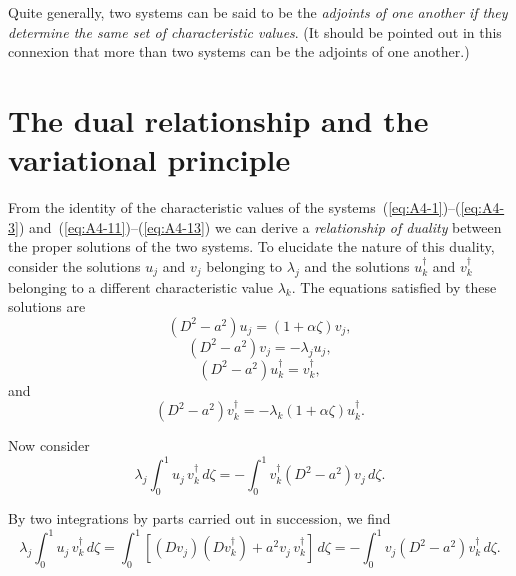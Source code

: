 Quite generally, two systems can be said to be the \emph{adjoints of one another
if they determine the same set of characteristic values}. (It should be
pointed out in this connexion that more than two systems can be the
adjoints of one another.)

\section{The dual relationship and the variational principle}
\label{sec:131}

From the identity of the characteristic values of the systems~(\ref{eq:A4-1})--(\ref{eq:A4-3})
and~(\ref{eq:A4-11})--(\ref{eq:A4-13}) we can derive a \emph{relationship of duality} between the proper
solutions of the two systems. To elucidate the nature of this duality,
consider the solutions $u_j$ and $v_j$ belonging to $\lambda_j$ and the solutions $u_k^\dagger$
and $v_k^\dagger$ belonging to a different characteristic value $\lambda_k$. The equations
satisfied by these solutions are
\begin{equation}
\label{eq:A4-24}
(D^2 - a^2)u_j = (1 + \alpha\zeta)v_j,
\end{equation}
\begin{equation}
\label{eq:A4-25}
(D^2 - a^2)v_j = -\lambda_j u_j,
\end{equation}
\begin{equation}
\label{eq:A4-26}
(D^2 - a^2)u_k^\dagger = v_k^\dagger,
\end{equation}
and
\begin{equation}
\label{eq:A4-27}
(D^2 - a^2)v_k^\dagger = -\lambda_k (1 + \alpha\zeta)u_k^\dagger.
\end{equation}

Now consider
\begin{equation}
\label{eq:A4-28}
\lambda_j \int_0^1 u_j \, v_k^\dagger \, d\zeta = -\int_0^1 v_k^\dagger (D^2 - a^2)v_j \, d\zeta.
\end{equation}

By two integrations by parts carried out in succession, we find
\begin{equation}
\label{eq:A4-29}
\lambda_j \int_0^1 u_j \, v_k^\dagger \, d\zeta = \int_0^1 [(Dv_j)(Dv_k^\dagger) + a^2 v_j \, v_k^\dagger] \, d\zeta
= -\int_0^1 v_j (D^2 - a^2)v_k^\dagger \, d\zeta.
\end{equation}

